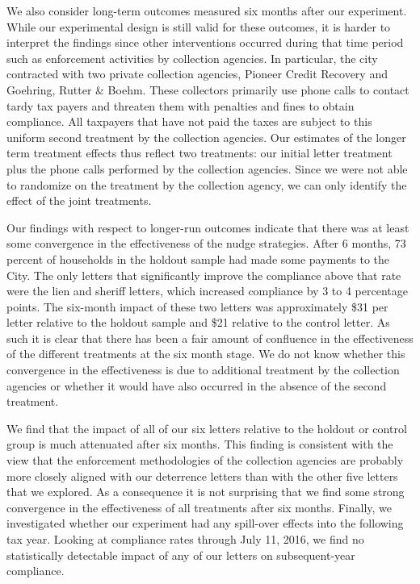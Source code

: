 \documentclass[12pt]{article}
\begin{document}
We also consider long-term outcomes measured six months after our
experiment. While our experimental design is still valid for these
outcomes, it is harder to interpret the findings since other
interventions occurred during that time period such as enforcement
activities by collection agencies. In particular, the city contracted with two
private collection agencies, Pioneer Credit Recovery and Goehring,
Rutter \& Boehm. These collectors primarily use phone calls to
contact tardy tax payers and threaten them with penalties and fines to
obtain compliance. All taxpayers that have not paid the taxes are
subject to this uniform second treatment by the collection
agencies.  Our estimates of the longer term treatment effects thus
reflect two treatments: our initial letter treatment plus the phone
calls performed by the collection agencies. Since we were not able to
randomize on the treatment by the collection agency, we can only
identify the effect of the joint treatments.

Our findings with respect to longer-run outcomes indicate that there
was at least some convergence in the effectiveness of the nudge
strategies. After 6 months, 73 percent of households in the holdout
sample had made some payments to the City. The only letters that
significantly improve the compliance above that rate were the lien and
sheriff letters, which increased compliance by 3 to 4 percentage
points. The six-month impact of these two letters was approximately
\$31 per letter relative to the holdout sample and \$21 relative to
the control letter. As such it is clear that there has been a fair amount of confluence in the
effectiveness of the different treatments at the six month stage. We
do not know whether this convergence in the effectiveness is due to
additional treatment by the collection agencies or whether it
would have also occurred in the absence of the second
treatment.

We find that the impact of all of our six letters relative to the holdout or
control group is much attenuated after six months. This finding is
consistent with the view that the enforcement methodologies of the
collection agencies are probably more closely aligned with our
deterrence letters than with the other five letters that we
explored. As a consequence it is not surprising that we find some
strong convergence in the effectiveness of all treatments after six
months. Finally, we investigated whether our experiment had any spill-over
effects into the following tax year. Looking at compliance rates through
July 11, 2016, we find no statistically detectable impact of any of our letters on
subsequent-year compliance.
\end{document}
